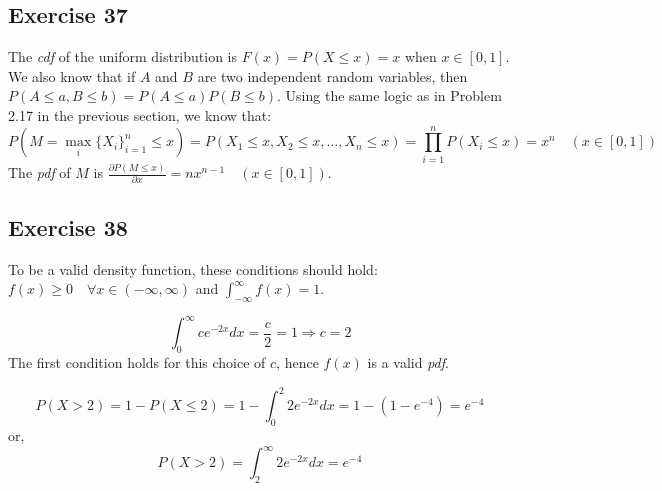 \documentclass{article}
\begin{document}
\subsection*{Exercise 37}
\begin{flushleft}
The \emph{cdf} of the uniform distribution is \(F(x) = P(X \leq x) = x\) when \(x \in [0, 1]\). We also know that if \(A\) and \(B\) are two independent random variables, then \(P(A \leq a, B \leq b) = P(A \leq a) P(B \leq b)\). Using the same logic as in Problem 2.17 in the previous section, we know that:
\begin{equation}
P(M = \max_{i}\{X_{i}\}_{i=1}^{n} \leq x) = P(X_{1} \leq x, X_{2} \leq x, \ldots, X_{n} \leq x) = \displaystyle \prod_{i=1}^{n} P(X_{i} \leq x) = x^{n} \quad (x \in [0, 1])
\end{equation}
The \emph{pdf} of \(M\) is \(\frac{\partial P(M \leq x)}{\partial x} = nx^{n-1} \quad (x \in [0, 1])\).
\end{flushleft}

\subsection*{Exercise 38}
\begin{flushleft}
To be a valid density function, these conditions should hold: \(f(x) \geq 0 \quad \forall x \in (-\infty, \infty)\) and \(\displaystyle \int_{-\infty}^{\infty} f(x) = 1\).

\begin{equation}
\displaystyle \int_{0}^{\infty} ce^{-2x} dx = \frac{c}{2} = 1 \Rightarrow c = 2
\end{equation}
The first condition holds for this choice of \(c\), hence \(f(x)\) is a valid \emph{pdf}.

\begin{equation}
P(X > 2) = 1 - P(X \leq 2) = 1 - \int_{0}^{2} 2e^{-2x} dx = 1 - (1 - e^{-4}) = e^{-4}
\end{equation}
or,
\begin{equation}
P(X > 2) = \int_{2}^{\infty} 2e^{-2x} dx = e^{-4}
\end{equation}
\end{flushleft}
\end{document}
